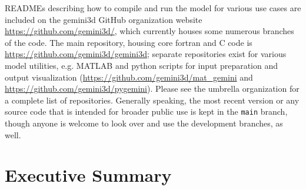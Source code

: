 \documentclass[11pt,letterpaper]{article}
\begin{document}
READMEs describing how to compile and run the model for various use cases are included on the gemini3d GitHub organization website \url{https://github.com/gemini3d/}, which currently houses some numerous branches of the code.  The main repository, housing core fortran and C code is \url{https://github.com/gemini3d/gemini3d}; separate repositories exist for various model utilities, e.g. MATLAB and python scripts for input preparation and output visualization (\url{https://github.com/gemini3d/mat_gemini} and \url{https://github.com/gemini3d/pygemini}).  Please see the umbrella organization for a complete list of repositories.  Generally speaking, the most recent version or any source code that is intended for broader public use is kept in the \texttt{main} branch, though anyone is welcome to look over and use the development branches, as well.  

\section{Executive Summary}
\end{document}
